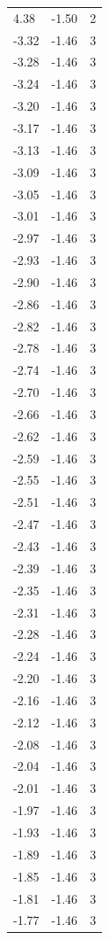 \begin{longtable}{lrr}
  4.38 & -1.50 & 2 \\
  -3.32 & -1.46 & 3 \\
  -3.28 & -1.46 & 3 \\
  -3.24 & -1.46 & 3 \\
  -3.20 & -1.46 & 3 \\
  -3.17 & -1.46 & 3 \\
  -3.13 & -1.46 & 3 \\
  -3.09 & -1.46 & 3 \\
  -3.05 & -1.46 & 3 \\
  -3.01 & -1.46 & 3 \\
  -2.97 & -1.46 & 3 \\
  -2.93 & -1.46 & 3 \\
  -2.90 & -1.46 & 3 \\
  -2.86 & -1.46 & 3 \\
  -2.82 & -1.46 & 3 \\
  -2.78 & -1.46 & 3 \\
  -2.74 & -1.46 & 3 \\
  -2.70 & -1.46 & 3 \\
  -2.66 & -1.46 & 3 \\
  -2.62 & -1.46 & 3 \\
  -2.59 & -1.46 & 3 \\
  -2.55 & -1.46 & 3 \\
  -2.51 & -1.46 & 3 \\
  -2.47 & -1.46 & 3 \\
  -2.43 & -1.46 & 3 \\
  -2.39 & -1.46 & 3 \\
  -2.35 & -1.46 & 3 \\
  -2.31 & -1.46 & 3 \\
  -2.28 & -1.46 & 3 \\
  -2.24 & -1.46 & 3 \\
  -2.20 & -1.46 & 3 \\
  -2.16 & -1.46 & 3 \\
  -2.12 & -1.46 & 3 \\
  -2.08 & -1.46 & 3 \\
  -2.04 & -1.46 & 3 \\
  -2.01 & -1.46 & 3 \\
  -1.97 & -1.46 & 3 \\
  -1.93 & -1.46 & 3 \\
  -1.89 & -1.46 & 3 \\
  -1.85 & -1.46 & 3 \\
  -1.81 & -1.46 & 3 \\
  -1.77 & -1.46 & 3 \\

\end{longtable}
